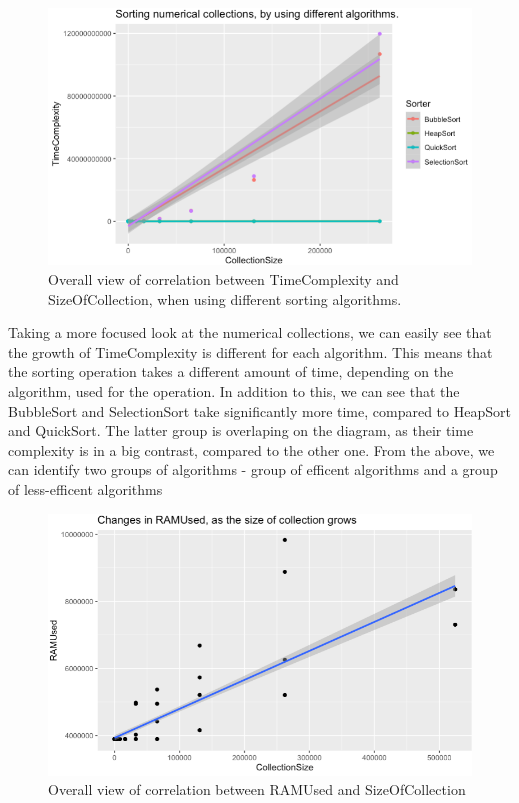 \documentclass[]{report}
\begin{document}
				
		\begin{figure}[h]
			\centering
			\includegraphics[width=0.7\linewidth]{overallInts}
			\caption[Figure 3.3]{Overall view of correlation between TimeComplexity and SizeOfCollection, when using different sorting algorithms.}
		\end{figure}
		
		Taking a more focused look at the numerical collections, we can easily see that the growth of TimeComplexity is different for each algorithm. This means that the sorting operation takes a different amount of time, depending on the algorithm, used for the operation. In addition to this, we can see that the BubbleSort and SelectionSort take significantly more time, compared to HeapSort and QuickSort. The latter group is overlaping on the diagram, as their time complexity is in a big contrast, compared to the other one. From the above, we can identify two groups of algorithms - group of efficent algorithms and a group of less-efficent algorithms
		
		\begin{figure}[h]
		\centering
		\includegraphics[width=0.7\linewidth]{ramUsageSize}
		\caption[Figure 3.4]{Overall view of correlation between RAMUsed and SizeOfCollection}
	\end{figure}
	
\end{document}

